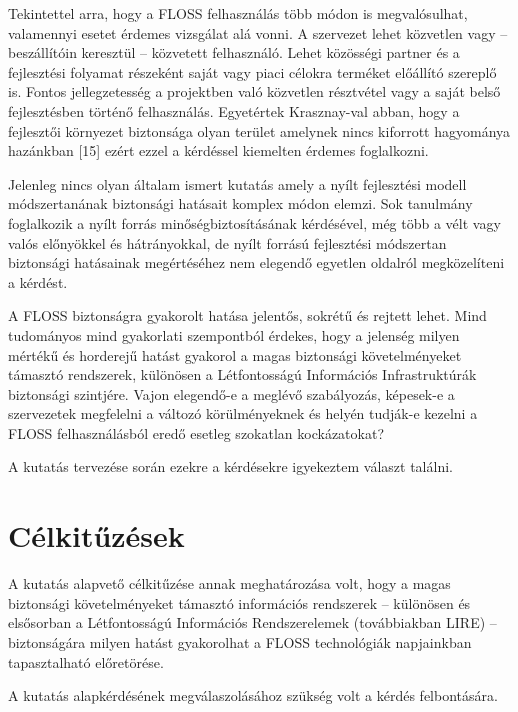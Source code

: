 \documentclass[12pt,magyar,a4paper,oneside]{scrreprt}
\begin{document}
Tekintettel arra, hogy a FLOSS felhasználás több módon is megvalósulhat,
valamennyi esetet érdemes vizsgálat alá vonni. A szervezet lehet
közvetlen vagy -- beszállítóin keresztül -- közvetett felhasználó. Lehet
közösségi partner és a fejlesztési folyamat részeként saját vagy piaci
célokra terméket előállító szereplő is. Fontos jellegzetesség a
projektben való közvetlen résztvétel vagy a saját belső fejlesztésben
történő felhasználás. Egyetértek Krasznay-val abban, hogy a fejlesztői
környezet biztonsága olyan terület amelynek nincs kiforrott hagyománya
hazánkban {[}15{]} ezért ezzel a kérdéssel kiemelten érdemes
foglalkozni.

Jelenleg nincs olyan általam ismert kutatás amely a nyílt fejlesztési
modell módszertanának biztonsági hatásait komplex módon elemzi. Sok
tanulmány foglalkozik a nyílt forrás minőségbiztosításának kérdésével,
még több a vélt vagy valós előnyökkel és hátrányokkal, de nyílt forrású
fejlesztési módszertan biztonsági hatásainak megértéséhez nem elegendő
egyetlen oldalról megközelíteni a kérdést.

A FLOSS biztonságra gyakorolt hatása jelentős, sokrétű és rejtett lehet.
Mind tudományos mind gyakorlati szempontból érdekes, hogy a jelenség
milyen mértékű és horderejű hatást gyakorol a magas biztonsági
követelményeket támasztó rendszerek, különösen a Létfontosságú
Információs Infrastruktúrák biztonsági szintjére. Vajon elegendő-e a
meglévő szabályozás, képesek-e a szervezetek megfelelni a változó
körülményeknek és helyén tudják-e kezelni a FLOSS felhasználásból eredő
esetleg szokatlan kockázatokat?

A kutatás tervezése során ezekre a kérdésekre igyekeztem választ
találni.

\hypertarget{sec:CELKITUZESEK}{%
\section{Célkitűzések}\label{sec:CELKITUZESEK}}

A kutatás alapvető célkitűzése annak meghatározása volt, hogy a magas
biztonsági követelményeket támasztó információs rendszerek -- különösen
és elsősorban a Létfontosságú Információs Rendszerelemek (továbbiakban
LIRE) -- biztonságára milyen hatást gyakorolhat a FLOSS technológiák
napjainkban tapasztalható előretörése.

A kutatás alapkérdésének megválaszolásához szükség volt a kérdés
felbontására.
\end{document}
